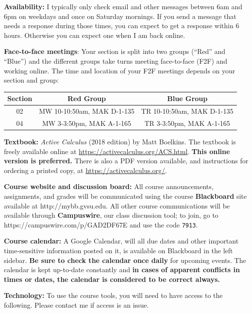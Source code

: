 \documentclass[]{article}
\begin{document}
\textbf{Availability:} I typically only check email and other messages
between 6am and 6pm on weekdays and once on Saturday mornings. If you
send a message that needs a response during those times, you can expect
to get a response within 6 hours. Otherwise you can expect one when I am
back online.

\textbf{Face-to-face meetings}: Your section is split into two groups
(``Red'' and ``Blue'') and the different groups take turns meeting
face-to-face (F2F) and working online. The time and location of your F2F
meetings depends on your section and group:

\begin{center}
    \begin{tabular}{c||c|c}
Section & Red Group & Blue Group \\ \hline
02 & MW 10-10:50am, MAK D-1-135 & TR 10-10:50am, MAK D-1-135 \\ \hline
04 & MW 3-3:50pm, MAK A-1-165 & TR 3-3:50pm, MAK A-1-165 
\end{tabular}
\end{center}



\textbf{Textbook:} \emph{Active Calculus} (2018 edition) by Matt
Boelkins. The textbook is freely available online at
\url{https://activecalculus.org/ACS.html}. \textbf{This online version is
preferred.} There is also a PDF version available, and instructions for
ordering a printed copy, at \url{https://activecalculus.org/}.

\textbf{Course website and discussion board:} All course announcements,
assignments, and grades will be communicated using the course
\textbf{Blackboard} site available at http://mybb.gvsu.edu. All other
course communications will be available through \textbf{Campuswire}, our
class discussion tool; to join, go to https://campuswire.com/p/GAD2DF67E
and use the code \texttt{7913}.

\textbf{Course calendar:} A Google Calendar, will all due dates and
other important time-sensitive information posted on it, is available on
Blackboard in the left sidebar. \textbf{Be sure to check the calendar
once daily} for upcoming events. The calendar is kept up-to-date
constantly and \textbf{in cases of apparent conflicts in times or dates,
the calendar is considered to be correct always.}

\textbf{Technology:} To use the course tools, you will need to have
access to the following. Please contact me if access is an issue. 
\end{document}
